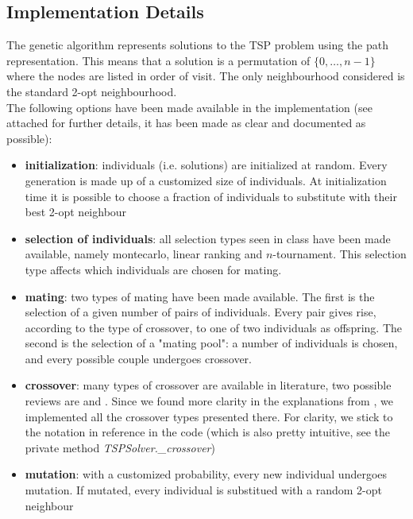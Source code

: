 \documentclass{article}
\begin{document}
\subsection{Implementation Details}
The genetic algorithm represents solutions to the TSP problem using the path representation. This means that a solution is a permutation of $\{0, \ldots, n-1\}$ where the nodes are listed in order of visit. The only neighbourhood considered is the standard 2-opt neighbourhood. \\
The following options have been made available in the implementation (see attached for further details, it has been made as clear and documented as possible):
\begin{itemize}
\item \textbf{initialization}: individuals (i.e. solutions) are initialized at random. Every generation is made up of a customized size of individuals. At initialization time it is possible to choose a fraction of individuals to substitute with their best 2-opt neighbour

\item \textbf{selection of individuals}: all selection types seen in class have been made available, namely montecarlo, linear ranking and $n$-tournament. This selection type affects which individuals are chosen for mating.

\item \textbf{mating}: two types of mating have been made available. The first is the selection of a given number of pairs of individuals. Every pair gives rise, according to the type of crossover, to one of two individuals as offspring. The second is the selection of a "mating pool": a number of individuals is chosen, and every possible couple undergoes crossover.

\item \textbf{crossover}: many types of crossover are available in literature, two possible reviews are \cite{gupta2011study} and \cite{abdoun2012comparative}. Since we found more clarity in the explanations from \cite{gupta2011study}, we implemented all the crossover types presented there. For clarity, we stick to the notation in reference in the code (which is also pretty intuitive, see the private method \textit{TSPSolver.\_crossover})

\item \textbf{mutation}: with a customized probability, every new individual undergoes mutation. If mutated, every individual is substitued with a random 2-opt neighbour


\end{itemize}
\end{document}
